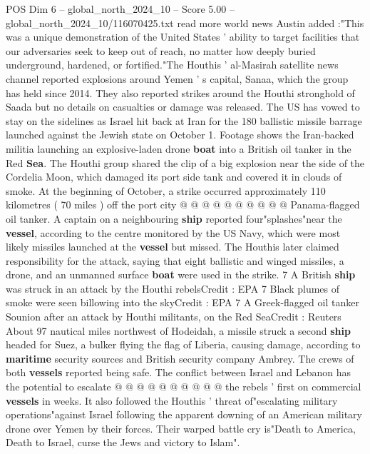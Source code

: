 \begin{textsample}{POS Dim 6 – global\_north\_2024\_10 – Score 5.00 – global\_north\_2024\_10/116070425.txt}  \label{ex:f6_pos_395}
read more world news Austin added :"This was a unique demonstration of the United States ' ability to target facilities that our adversaries seek to keep out of reach, no matter how deeply buried underground, hardened, or fortified."The Houthis ' al-Masirah satellite news channel reported explosions around Yemen ' s capital, Sanaa, which the group has held since 2014.
They also reported strikes around the Houthi stronghold of Saada but no details on casualties or damage was released.
The US has vowed to stay on the sidelines as Israel hit back at Iran for the 180 ballistic missile barrage launched against the Jewish state on October 1.
Footage shows the Iran-backed militia launching an explosive-laden drone \textbf{boat} into a British oil tanker in the Red \textbf{Sea}.
The Houthi group shared the clip of a big explosion near the side of the Cordelia Moon, which damaged its port side tank and covered it in clouds of smoke.
At the beginning of October, a strike occurred approximately 110 kilometres ( 70 miles ) off the port city @ @ @ @ @ @ @ @ @ @ Panama-flagged oil tanker.
A captain on a neighbouring \textbf{ship} reported four"splashes"near the \textbf{vessel}, according to the centre monitored by the US Navy, which were most likely missiles launched at the \textbf{vessel} but missed.
The Houthis later claimed responsibility for the attack, saying that eight ballistic and winged missiles, a drone, and an unmanned surface \textbf{boat} were used in the strike. 7 A British \textbf{ship} was struck in an attack by the Houthi rebelsCredit : EPA 7 Black plumes of smoke were seen billowing into the skyCredit : EPA 7 A Greek-flagged oil tanker Sounion after an attack by Houthi militants, on the Red SeaCredit : Reuters About 97 nautical miles northwest of Hodeidah, a missile struck a second \textbf{ship} headed for Suez, a bulker flying the flag of Liberia, causing damage, according to \textbf{maritime} security sources and British security company Ambrey.
The crews of both \textbf{vessels} reported being safe.
The conflict between Israel and Lebanon has the potential to escalate @ @ @ @ @ @ @ @ @ @ the rebels ' first on commercial \textbf{vessels} in weeks.
It also followed the Houthis ' threat of"escalating military operations"against Israel following the apparent downing of an American military drone over Yemen by their forces.
Their warped battle cry is"Death to America, Death to Israel, curse the Jews and victory to Islam".

\end{textsample}
